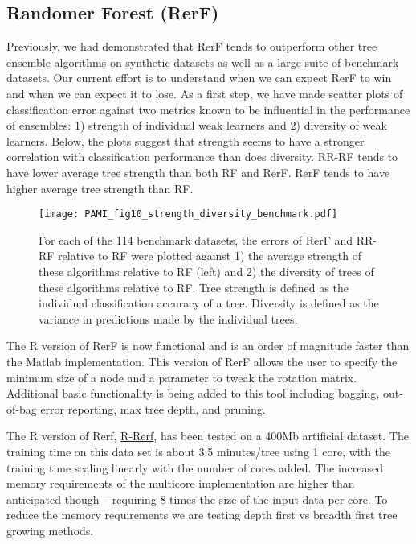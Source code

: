 \documentclass[simplex.tex]{subfiles}
\begin{document}
\subsection[Randomer Forest]{Randomer Forest (RerF)}

Previously, we had demonstrated that RerF tends to outperform other tree ensemble algorithms on synthetic datasets as well as a large suite of benchmark datasets. Our current effort is to understand when we can expect RerF to win and when we can expect it to lose. As a first step, we have made scatter plots of classification error against two metrics known to be influential in the performance of ensembles: 1) strength of individual weak learners and 2) diversity of weak learners. Below, the plots suggest that strength seems to have a stronger correlation with classification performance than does diversity. RR-RF tends to have lower average tree strength than both RF and RerF. RerF tends to have higher average tree strength than RF.

\begin{figure}[h!]
\begin{cframed}
\centering
\texttt{[image: PAMI\_fig10\_strength\_diversity\_benchmark.pdf]}
\caption{
For each of the 114 benchmark datasets, the errors of RerF and RR-RF relative to RF were plotted against 1) the average strength of these algorithms relative to RF (left) and 2) the diversity of trees of these algorithms relative to RF. Tree strength is defined as the individual classification accuracy of a tree. Diversity is defined as the variance in predictions made by the individual trees.
}
\label{fig:RefF3}
\end{cframed}
\end{figure}

The R version of RerF is now functional and is an order of magnitude faster than the Matlab implementation.  This version of RerF allows the user to specify the minimum size of a node and a parameter to tweak the rotation matrix.  Additional basic functionality is being added to this tool including bagging, out-of-bag error reporting, max tree depth, and pruning.


\clearpage
The R version of Rerf, \href{https://github.com/neurodata/R-RerF}{R-Rerf}, has been tested on a 400Mb artificial dataset.  The training time on this data set is about 3.5 minutes/tree using 1 core, with the training time scaling linearly with the number of cores added.  The increased memory requirements of the multicore implementation are higher than anticipated though -- requiring 8 times the size of the input data per core.  To reduce the memory requirements we are testing depth first vs breadth first tree growing methods.  

\clearpage
\end{document}
